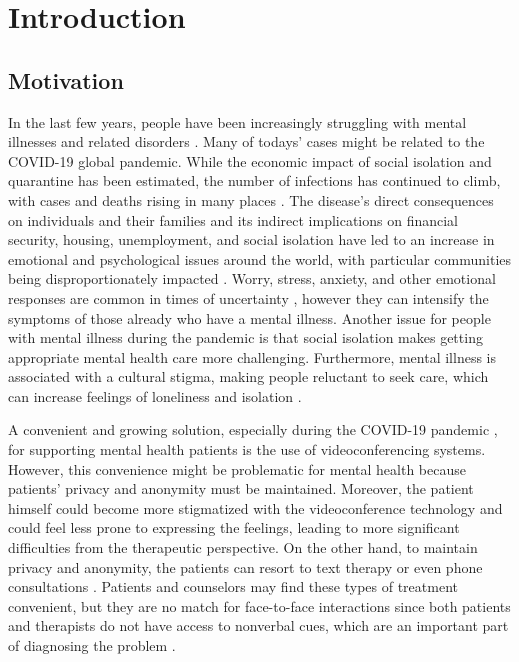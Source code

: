 \section{Introduction}

\subsection{Motivation}
In the last few years, people have been increasingly struggling with mental illnesses and related disorders \cite{COS20, KUM21}. Many of todays' cases might be related to the COVID-19 global pandemic. While the economic impact of social isolation and quarantine has been estimated, the number of infections has continued to climb, with cases and deaths rising in many places \cite{CLA20, GAY20, RAS21}. The disease's direct consequences on individuals and their families and its indirect implications on financial security, housing, unemployment, and social isolation have led to an increase in emotional and psychological issues around the world, with particular communities being disproportionately impacted \cite{CLA20, GAY20, RAS21}. Worry, stress, anxiety, and other emotional responses are common in times of uncertainty \cite{EHR20, CHE20, JOH20}, however they can intensify the symptoms of those already who have a mental illness. Another issue for people with mental illness during the pandemic is that social isolation makes getting appropriate mental health care more challenging. Furthermore, mental illness is associated with a cultural stigma, making people reluctant to seek care, which can increase feelings of loneliness and isolation \cite{HAM18}.

A convenient and growing solution, especially during the COVID-19 pandemic \cite{BOL20, BEK20, WIN20}, for supporting mental health patients is the use of videoconferencing systems. However, this convenience might be problematic for mental health because patients' privacy and anonymity must be maintained. Moreover, the patient himself could become more stigmatized with the videoconference technology \cite{BAT14, MAL22} and could feel less prone to expressing the feelings, leading to more significant difficulties from the therapeutic perspective. On the other hand, to maintain privacy and anonymity, the patients can resort to text therapy or even phone consultations \cite{AGY21, LIB21, AGU21, AGY20, ZHA20}. Patients and counselors may find these types of treatment convenient, but they are no match for face-to-face interactions since both patients and therapists do not have access to nonverbal cues, which are an important part of diagnosing the problem \cite{SUC12, LIN21}.

